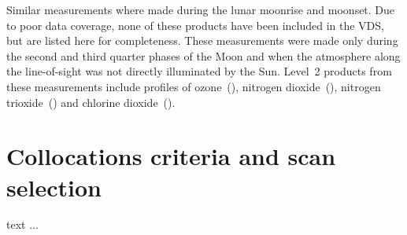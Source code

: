 Similar measurements where made during the lunar moonrise and moonset. Due to
poor data coverage, none of these products have been included in the VDS, but
are listed here for completeness.  These measurements were made only during the
second and third quarter phases of the Moon and when the atmosphere along the
line-of-sight was not directly illuminated by the Sun.  Level~2 products from
these measurements include profiles of ozone~(), nitrogen
dioxide~(), nitrogen trioxide~() and chlorine
dioxide~().



\section{Collocations criteria and scan selection}
 
text ...


